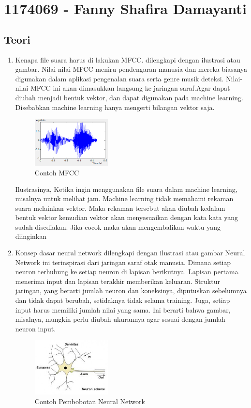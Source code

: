 \section{1174069 - Fanny Shafira Damayanti}
\subsection{Teori}
\begin{enumerate}
	\item Kenapa file suara harus di lakukan MFCC. dilengkapi dengan ilustrasi atau gambar.
	\hfill\break
	Nilai-nilai MFCC meniru pendengaran manusia dan mereka biasanya digunakan dalam aplikasi pengenalan suara serta genre musik deteksi. Nilai-nilai MFCC ini akan dimasukkan langsung ke jaringan saraf.Agar dapat diubah menjadi bentuk vektor, dan dapat digunakan pada machine learning. Disebabkan machine learning hanya mengerti bilangan vektor saja.
	\begin{figure}[H]
		\includegraphics[width=4cm]{figures/1174069/6/7.png}
		\centering
		\caption{Contoh MFCC}
	\end{figure}
	Ilustrasinya, Ketika ingin menggunakan file suara dalam machine learning, misalnya untuk melihat jam. Machine learning tidak memahami rekaman suara melainkan vektor. Maka rekaman tersebut akan diubah kedalam bentuk vektor kemudian vektor akan menyesuaikan dengan kata kata yang sudah disediakan. Jika cocok maka akan mengembalikan waktu yang diinginkan
	
	\item Konsep dasar neural network dilengkapi dengan ilustrasi atau gambar
	\hfill\break
	Neural Network ini terinspirasi dari jaringan saraf otak manusia. Dimana setiap neuron terhubung ke setiap neuron di lapisan berikutnya. Lapisan pertama menerima input dan lapisan terakhir memberikan keluaran. Struktur jaringan, yang berarti jumlah neuron dan koneksinya, diputuskan sebelumnya dan tidak dapat berubah, setidaknya tidak selama training. Juga, setiap input harus memiliki jumlah nilai yang sama. Ini berarti bahwa gambar, misalnya, mungkin perlu diubah ukurannya agar sesuai dengan jumlah neuron input.
	\begin{figure}[H]
		\includegraphics[width=4cm]{figures/1174069/6/8.jpg}
		\centering
		\caption{Contoh Pembobotan Neural Network}
	\end{figure}


\end{enumerate}
